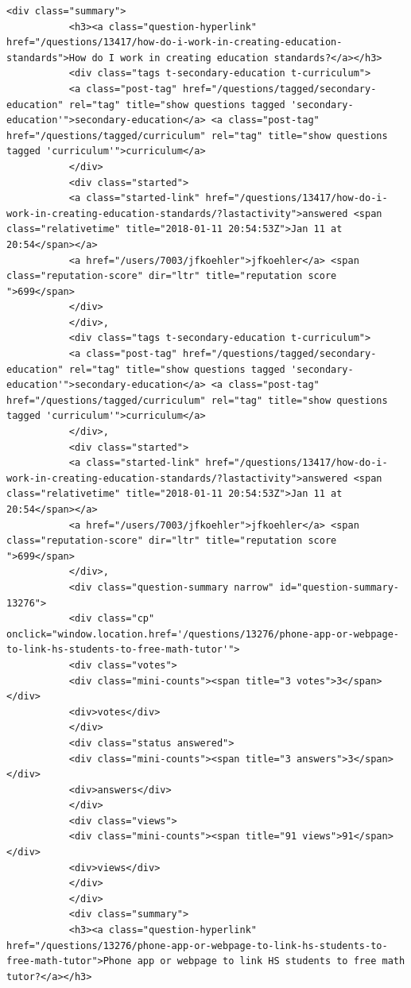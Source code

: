 \documentclass[11pt]{article}
\begin{document}
\begin{Verbatim}[commandchars=\\\{\}]
           <div class="summary">
           <h3><a class="question-hyperlink" href="/questions/13417/how-do-i-work-in-creating-education-standards">How do I work in creating education standards?</a></h3>
           <div class="tags t-secondary-education t-curriculum">
           <a class="post-tag" href="/questions/tagged/secondary-education" rel="tag" title="show questions tagged 'secondary-education'">secondary-education</a> <a class="post-tag" href="/questions/tagged/curriculum" rel="tag" title="show questions tagged 'curriculum'">curriculum</a>
           </div>
           <div class="started">
           <a class="started-link" href="/questions/13417/how-do-i-work-in-creating-education-standards/?lastactivity">answered <span class="relativetime" title="2018-01-11 20:54:53Z">Jan 11 at 20:54</span></a>
           <a href="/users/7003/jfkoehler">jfkoehler</a> <span class="reputation-score" dir="ltr" title="reputation score ">699</span>
           </div>
           </div>,
           <div class="tags t-secondary-education t-curriculum">
           <a class="post-tag" href="/questions/tagged/secondary-education" rel="tag" title="show questions tagged 'secondary-education'">secondary-education</a> <a class="post-tag" href="/questions/tagged/curriculum" rel="tag" title="show questions tagged 'curriculum'">curriculum</a>
           </div>,
           <div class="started">
           <a class="started-link" href="/questions/13417/how-do-i-work-in-creating-education-standards/?lastactivity">answered <span class="relativetime" title="2018-01-11 20:54:53Z">Jan 11 at 20:54</span></a>
           <a href="/users/7003/jfkoehler">jfkoehler</a> <span class="reputation-score" dir="ltr" title="reputation score ">699</span>
           </div>,
           <div class="question-summary narrow" id="question-summary-13276">
           <div class="cp" onclick="window.location.href='/questions/13276/phone-app-or-webpage-to-link-hs-students-to-free-math-tutor'">
           <div class="votes">
           <div class="mini-counts"><span title="3 votes">3</span></div>
           <div>votes</div>
           </div>
           <div class="status answered">
           <div class="mini-counts"><span title="3 answers">3</span></div>
           <div>answers</div>
           </div>
           <div class="views">
           <div class="mini-counts"><span title="91 views">91</span></div>
           <div>views</div>
           </div>
           </div>
           <div class="summary">
           <h3><a class="question-hyperlink" href="/questions/13276/phone-app-or-webpage-to-link-hs-students-to-free-math-tutor">Phone app or webpage to link HS students to free math tutor?</a></h3>

\end{Verbatim}
\end{document}
